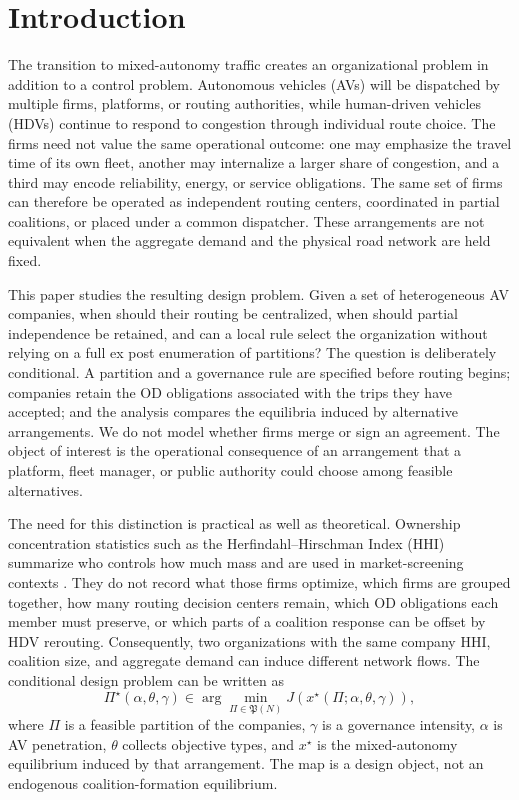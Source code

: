 \section{Introduction}\label{sec:intro}

The transition to mixed-autonomy traffic creates an organizational problem in addition to a control problem. Autonomous vehicles (AVs) will be dispatched by multiple firms, platforms, or routing authorities, while human-driven vehicles (HDVs) continue to respond to congestion through individual route choice. The firms need not value the same operational outcome: one may emphasize the travel time of its own fleet, another may internalize a larger share of congestion, and a third may encode reliability, energy, or service obligations. The same set of firms can therefore be operated as independent routing centers, coordinated in partial coalitions, or placed under a common dispatcher. These arrangements are not equivalent when the aggregate demand and the physical road network are held fixed.

This paper studies the resulting design problem. Given a set of heterogeneous
AV companies, when should their routing be centralized, when should partial
independence be retained, and can a local rule select the organization without
relying on a full ex post enumeration of partitions? The question is
deliberately conditional. A partition and a governance rule are specified
before routing begins; companies retain the OD obligations associated with the
trips they have accepted; and the analysis compares the equilibria induced by
alternative arrangements. We do not model whether firms merge or sign an
agreement. The object of interest is the operational consequence of an
arrangement that a platform, fleet manager, or public authority could choose
among feasible alternatives.

The need for this distinction is practical as well as theoretical. Ownership concentration statistics such as the Herfindahl--Hirschman Index (HHI) summarize who controls how much mass and are used in market-screening contexts \citep{usdojftc2023}. They do not record what those firms optimize, which firms are grouped together, how many routing decision centers remain, which OD obligations each member must preserve, or which parts of a coalition response can be offset by HDV rerouting. Consequently, two organizations with the same company HHI, coalition size, and aggregate demand can induce different network flows. The conditional design problem can be written as
\begin{equation}
\Pi^\star(\alpha,\theta,\gamma)\in\arg\min_{\Pi\in\mathfrak P(N)}J\!\left(x^\star(\Pi;\alpha,\theta,\gamma)\right),
\label{eq:design-map-intro}
\end{equation}
where $\Pi$ is a feasible partition of the companies, $\gamma$ is a governance intensity, $\alpha$ is AV penetration, $\theta$ collects objective types, and $x^\star$ is the mixed-autonomy equilibrium induced by that arrangement. The map is a design object, not an endogenous coalition-formation equilibrium.

